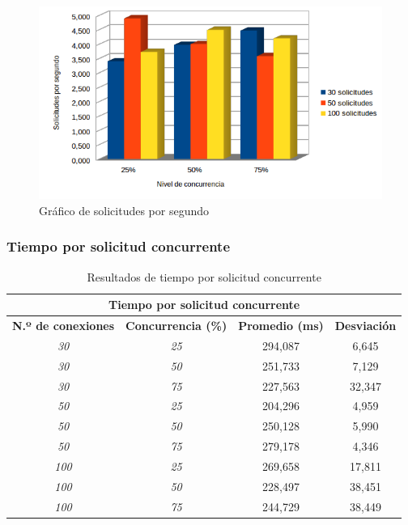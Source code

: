 \begin{figure}[!ht]
	\begin{center}
		\includegraphics[width=1\textwidth]{../images/gra_sps.png}
		\caption{Gráfico de solicitudes por segundo}
		\label{fig:gra_sps}
	\end{center}
\end{figure}

\newpage
\subsubsection{Tiempo por solicitud concurrente}
\begin{table}[!ht]
	\begin{center}
		\begin{tabular}{|c|c|c|c|}
			\hline
			\multicolumn{4}{|c|}{{\bf Tiempo por solicitud concurrente}}                               \\ \hline
			{\bf N.º de conexiones} & {\bf Concurrencia (\%)} & {\bf Promedio (ms)} & {\bf Desviación} \\ \hline
			{\it 30}                & {\it 25}                & 294,087             & 6,645            \\ \hline
			{\it 30}                & {\it 50}                & 251,733             & 7,129            \\ \hline
			{\it 30}                & {\it 75}                & 227,563             & 32,347           \\ \hline
			{\it 50}                & {\it 25}                & 204,296             & 4,959            \\ \hline
			{\it 50}                & {\it 50}                & 250,128             & 5,990            \\ \hline
			{\it 50}                & {\it 75}                & 279,178             & 4,346            \\ \hline
			{\it 100}               & {\it 25}                & 269,658             & 17,811           \\ \hline
			{\it 100}               & {\it 50}                & 228,497             & 38,451           \\ \hline
			{\it 100}               & {\it 75}                & 244,729             & 38,449           \\ \hline
		\end{tabular}
		\caption{Resultados de tiempo por solicitud concurrente}
		\label{table:rtsc}
	\end{center}
\end{table}

